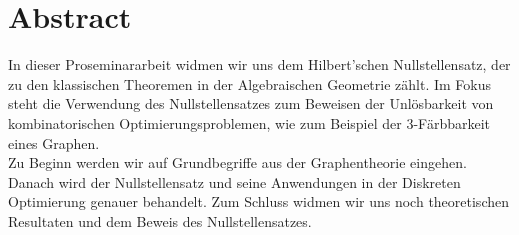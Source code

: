 \vspace*{0.2cm}\section*{Abstract}
In dieser Proseminararbeit widmen wir uns dem Hilbert'schen Nullstellensatz, der zu den klassischen Theoremen in der Algebraischen Geometrie zählt. Im Fokus steht die Verwendung des Nullstellensatzes zum Beweisen der Unlösbarkeit von kombinatorischen Optimierungsproblemen, wie zum Beispiel der 3-Färbbarkeit eines Graphen. \\

\noindent Zu Beginn werden wir auf Grundbegriffe aus der Graphentheorie eingehen. Danach wird der Nullstellensatz und seine Anwendungen in der Diskreten Optimierung genauer behandelt. Zum Schluss widmen wir uns noch theoretischen Resultaten und dem Beweis des Nullstellensatzes. 

